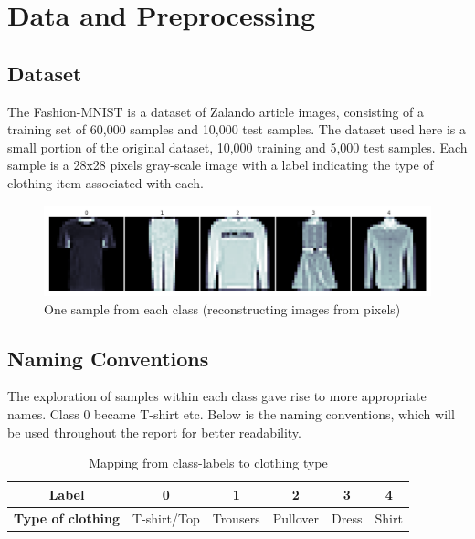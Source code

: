 \section{Data and Preprocessing}
\subsection{Dataset}
The Fashion-MNIST is a dataset of Zalando article images, consisting of a training set of 60,000 samples and 10,000 test samples.
The dataset used here is a small portion of the original dataset, 10,000 training and 5,000 test samples.
Each sample is a 28x28 pixels gray-scale image with a label indicating the type of clothing item associated with each.
\newline

\begin{figure}[ht]
\centering
\includegraphics[scale=0.45]{figures_for_report/samples_from_classes}
\captionsetup{justification=centering,margin=2cm}
\caption{One sample from each class (reconstructing images from pixels)}
\end{figure}
\subsection{Naming Conventions}
The exploration of samples within each class gave rise to more appropriate names.
Class 0 became T-shirt etc.
Below is the naming conventions, which will be used throughout the report for better readability.  \\
\begin{table}[!ht]
  \footnotesize
  \centering
\begin{tabular}{ c c c c c c }
 \toprule
 \textbf{Label} & \textbf{0} & \textbf{1} & \textbf{2} & \textbf{3} & \textbf{4} \\
 \midrule 
 \textbf{Type of clothing} & T-shirt/Top & Trousers & Pullover & Dress & Shirt \\
 \bottomrule
\end{tabular} \\[0.2cm]
\captionsetup{justification=centering,margin=2cm}
\caption{Mapping from class-labels to clothing type}
\label{features}
\end{table}


